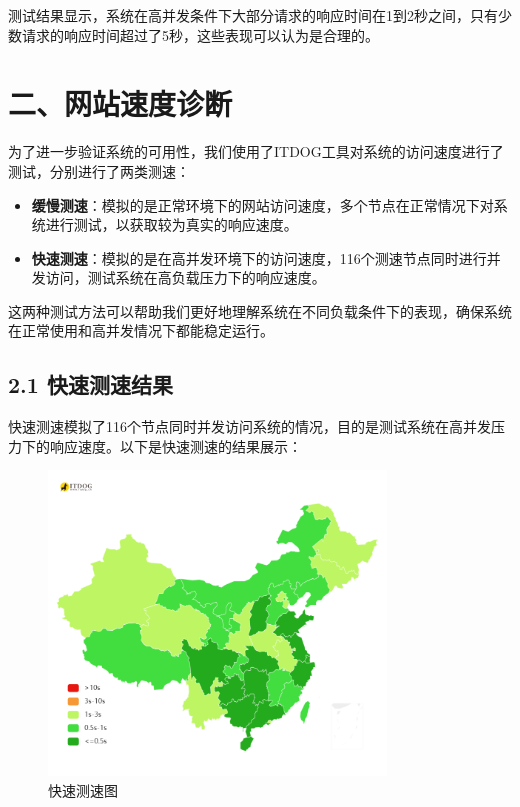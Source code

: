 \documentclass{article}
\begin{document}
测试结果显示，系统在高并发条件下大部分请求的响应时间在1到2秒之间，只有少数请求的响应时间超过了5秒，这些表现可以认为是合理的。

\section*{二、网站速度诊断}

为了进一步验证系统的可用性，我们使用了ITDOG工具对系统的访问速度进行了测试，分别进行了两类测速：
\begin{itemize}
    \item \textbf{缓慢测速}：模拟的是正常环境下的网站访问速度，多个节点在正常情况下对系统进行测试，以获取较为真实的响应速度。
    \item \textbf{快速测速}：模拟的是在高并发环境下的访问速度，116个测速节点同时进行并发访问，测试系统在高负载压力下的响应速度。
\end{itemize}

这两种测试方法可以帮助我们更好地理解系统在不同负载条件下的表现，确保系统在正常使用和高并发情况下都能稳定运行。

\subsection*{2.1 快速测速结果}
快速测速模拟了116个节点同时并发访问系统的情况，目的是测试系统在高并发压力下的响应速度。以下是快速测速的结果展示：

\begin{figure}[H]
    \centering
    \includegraphics[width=0.8\textwidth]{快速测速.png}
    \caption{快速测速图}
\end{figure}
\end{document}
